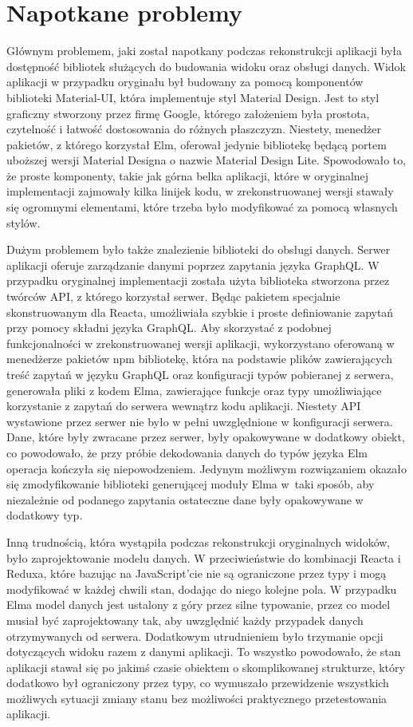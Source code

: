 \section{Napotkane problemy}
Głównym problemem, jaki został napotkany podczas rekonstrukcji aplikacji była dostępność bibliotek służących do budowania widoku oraz obsługi danych. Widok aplikacji w przypadku oryginału był budowany za pomocą komponentów biblioteki Material-UI, która implementuje styl Material Design. Jest to styl graficzny stworzony przez firmę Google, którego założeniem była prostota, czytelność i łatwość dostosowania do różnych płaszczyzn. Niestety, menedżer pakietów, z którego korzystał Elm, oferował jedynie bibliotekę będącą portem uboższej wersji Material Designa o nazwie Material Design Lite. Spowodowało to, że proste komponenty, takie jak górna belka aplikacji, które w oryginalnej implementacji zajmowały kilka linijek kodu, w zrekonstruowanej wersji stawały się ogromnymi elementami, które trzeba było modyfikować za pomocą własnych stylów.

Dużym problemem było także znalezienie biblioteki do obsługi danych. Serwer aplikacji oferuje zarządzanie danymi poprzez zapytania języka GraphQL. W przypadku oryginalnej implementacji została użyta biblioteka stworzona przez twórców API, z którego korzystał serwer. Będąc pakietem specjalnie skonstruowanym dla Reacta, umożliwiała szybkie i proste definiowanie zapytań przy pomocy składni języka GraphQL. Aby skorzystać z podobnej funkcjonalności w zrekonstruowanej wersji aplikacji, wykorzystano oferowaną w menedżerze pakietów npm bibliotekę, która na podstawie plików zawierających treść zapytań w języku GraphQL oraz konfiguracji typów pobieranej z serwera, generowała pliki z kodem Elma, zawierające funkcje oraz typy umożliwiające korzystanie z zapytań do serwera wewnątrz kodu aplikacji. Niestety API wystawione przez serwer nie było w pełni uwzględnione w konfiguracji serwera. Dane, które były zwracane przez serwer, były opakowywane w dodatkowy obiekt, co powodowało, że przy próbie dekodowania danych do typów języka Elm operacja kończyła się niepowodzeniem. Jedynym możliwym rozwiązaniem okazało się zmodyfikowanie biblioteki generującej moduły Elma w~taki sposób, aby niezależnie od podanego zapytania ostateczne dane były opakowywane w dodatkowy typ.

Inną trudnością, która wystąpiła podczas rekonstrukcji oryginalnych widoków, było zaprojektowanie modelu danych. W przeciwieństwie do kombinacji Reacta i Reduxa, które bazując na JavaScript'cie nie są ograniczone przez typy i mogą modyfikować w każdej chwili stan, dodając do niego kolejne pola. W przypadku Elma model danych jest ustalony z góry przez silne typowanie, przez co model musiał być zaprojektowany tak, aby uwzględnić każdy przypadek danych otrzymywanych od serwera. Dodatkowym utrudnieniem było trzymanie opcji dotyczących widoku razem z danymi aplikacji. To wszystko powodowało, że stan aplikacji stawał się po jakimś czasie obiektem o skomplikowanej strukturze, który dodatkowo był ograniczony przez typy, co wymuszało przewidzenie wszystkich możliwych sytuacji zmiany stanu bez możliwości praktycznego przetestowania aplikacji.